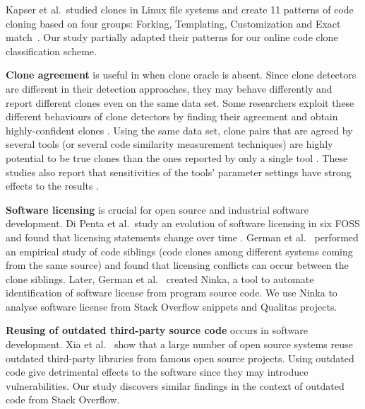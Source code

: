 \documentclass{sig-alternate-05-2015}
\begin{document}
Kapser et al.~studied clones in Linux file systems and create 11 patterns of code cloning based on four groups: Forking, Templating, Customization and Exact match~\cite{Kapser2003,Kapser2008}. Our study partially adapted their patterns for our online code clone classification scheme.

\textbf{Clone agreement} is useful in when clone oracle is absent. Since clone detectors are different in their detection approaches, they may behave differently and report different clones even on the same data set. Some researchers exploit these different behaviours of clone detectors by finding their agreement and obtain highly-confident clones \cite{Bellon2007,Wang2013}. Using the same data set, clone pairs that are agreed by several tools (or several code similarity measurement techniques) are highly potential to be true clones than the ones reported by only a single tool \cite{Wang2013,cr2016ssbse,Funaro2010}. These studies also report that sensitivities of the tools' parameter settings have strong effects to the results \cite{Wang2013,cr2016ssbse}.

\textbf{Software licensing} is crucial for open source and industrial software development. Di Penta et al.~study an evolution of software licensing in six FOSS and found that licensing statements change over time \cite{DiPenta2010}. German et al.~\cite{German2009} performed an empirical study of code siblings (code clones among different systems coming from the same source) and found that licensing conflicts can occur between the clone siblings. Later, German et al.~\cite{German2010} created Ninka, a tool to automate identification of software license from program source code. We use Ninka to analyse software license from Stack Overflow snippets and Qualitas projects. 

\textbf{Reusing of outdated third-party source code} occurs in software development. Xia et al.~\cite{Xia2014} show that a large number of open source systems reuse outdated third-party libraries from famous open source projects. Using outdated code give detrimental effects to the software since they may introduce vulnerabilities. Our study discovers similar findings in the context of outdated code from Stack Overflow.
\end{document}
